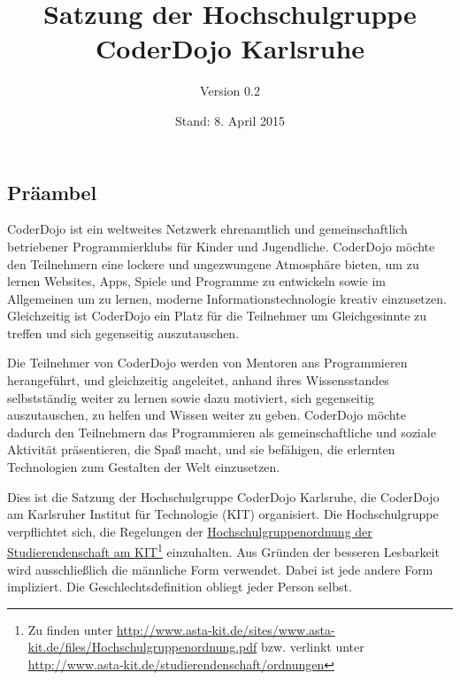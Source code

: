 \documentclass[a4paper, parskip=half, numbers=noenddot]{scrartcl}
\title{Satzung der Hochschulgruppe\\CoderDojo Karlsruhe}
\author{Version 0.2}
\date{Stand: 8. April 2015}
\begin{document}
%
%

\maketitle
\vfill
\begin{contract}

%
%

\tableofcontents
\vspace{2em}

%
%

\section*{Präambel}

CoderDojo ist ein weltweites Netzwerk ehrenamtlich und gemeinschaftlich
betriebener Programmierklubs für Kinder und Jugendliche.
CoderDojo möchte den Teilnehmern eine lockere und ungezwungene Atmosphäre
bieten, um zu lernen Websites, Apps, Spiele und Programme zu entwickeln sowie im
Allgemeinen um zu lernen, moderne Informationstechnologie kreativ einzusetzen.
Gleichzeitig ist CoderDojo ein Platz für die Teilnehmer um Gleichgesinnte zu
treffen und sich gegenseitig auszutauschen.

Die Teilnehmer von CoderDojo werden von Mentoren ans Programmieren herangeführt,
und gleichzeitig angeleitet, anhand ihres Wissensstandes selbstständig weiter zu
lernen sowie dazu motiviert, sich gegenseitig auszutauschen, zu helfen und
Wissen weiter zu geben.
CoderDojo möchte dadurch den Teilnehmern das Programmieren als gemeinschaftliche
und soziale Aktivität präsentieren, die Spaß macht, und sie befähigen, die
erlernten Technologien zum Gestalten der Welt einzusetzen.

Dies ist die Satzung der Hochschulgruppe CoderDojo Karlsruhe, die CoderDojo
am Karlsruher Institut für Technologie (KIT) organisiert.
Die Hochschulgruppe verpflichtet sich, die Regelungen der
\href{http://www.asta-kit.de/studierendenschaft/ordnungen}{Hochschulgruppenordnung der Studierendenschaft am KIT}\footnote{Zu finden unter \url{http://www.asta-kit.de/sites/www.asta-kit.de/files/Hochschulgruppenordnung.pdf} bzw. verlinkt unter \url{http://www.asta-kit.de/studierendenschaft/ordnungen}} einzuhalten.
Aus Gründen der besseren Lesbarkeit wird ausschließlich die männliche Form
verwendet. Dabei ist jede andere Form impliziert. Die Geschlechtsdefinition
obliegt jeder Person selbst.
\newpage


\end{contract}
\end{document}
